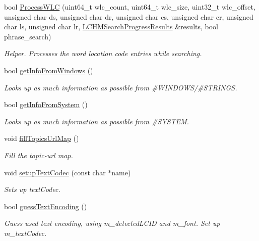 \begin{DoxyCompactItemize}
bool \hyperlink{classLCHMFileImpl_adb1b14253941ebf518aa458e9fdeb0d7}{Process\+W\+L\+C} (uint64\+\_\+t wlc\+\_\+count, uint64\+\_\+t wlc\+\_\+size, uint32\+\_\+t wlc\+\_\+offset, unsigned char ds, unsigned char dr, unsigned char cs, unsigned char cr, unsigned char ls, unsigned char lr, \hyperlink{libchmfileimpl_8h_a49915bbafbeae4acb86601a1e4f0c247}{L\+C\+H\+M\+Search\+Progress\+Results} \&results, bool phrase\+\_\+search)
\begin{DoxyCompactList}\small\item\em Helper. Processes the word location code entries while searching. \end{DoxyCompactList}\item 
bool \hyperlink{classLCHMFileImpl_a27eafb562224f7159476f816492fa32d}{get\+Info\+From\+Windows} ()
\begin{DoxyCompactList}\small\item\em Looks up as much information as possible from \#\+W\+I\+N\+D\+O\+W\+S/\#\+S\+T\+R\+I\+N\+G\+S. \end{DoxyCompactList}\item 
bool \hyperlink{classLCHMFileImpl_acb5511d96588dbcaa557d3e5dae04b75}{get\+Info\+From\+System} ()
\begin{DoxyCompactList}\small\item\em Looks up as much information as possible from \#\+S\+Y\+S\+T\+E\+M. \end{DoxyCompactList}\item 
void \hyperlink{classLCHMFileImpl_a804539b5cbf92972efde3d56cbf42477}{fill\+Topics\+Url\+Map} ()
\begin{DoxyCompactList}\small\item\em Fill the topic-\/url map. \end{DoxyCompactList}\item 
void \hyperlink{classLCHMFileImpl_a577e4f87f3481ff5afdeadac1be3d71d}{setup\+Text\+Codec} (const char $\ast$name)
\begin{DoxyCompactList}\small\item\em Sets up text\+Codec. \end{DoxyCompactList}\item 
bool \hyperlink{classLCHMFileImpl_aaa1a1c472fc85e30e6d970b9056c7cba}{guess\+Text\+Encoding} ()
\begin{DoxyCompactList}\small\item\em Guess used text encoding, using m\+\_\+detected\+L\+C\+I\+D and m\+\_\+font. Set up m\+\_\+text\+Codec. \end{DoxyCompactList}\item 

\end{DoxyCompactItemize}
